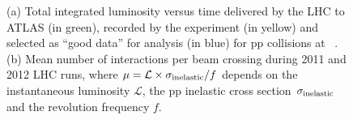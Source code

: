 \begin{figure}[tb]\begin{center}
	\caption{(a) Total integrated luminosity versus time delivered by the LHC to ATLAS (in green), recorded by the experiment 
        (in yellow) and selected as ``good data'' for analysis (in blue) for pp collisions at ~\tev.
        (b) Mean number of interactions per beam crossing during 2011 and 2012 LHC runs, where 
        $\mu = \mathcal L\times \sigma_{\rm inelastic}/f$ depends on the instantaneous luminosity $\mathcal L$, the pp inelastic
        cross section $\sigma_{\rm inelastic}$ and the revolution frequency $f$.~\cite{lumi}}
\end{center}\end{figure}

